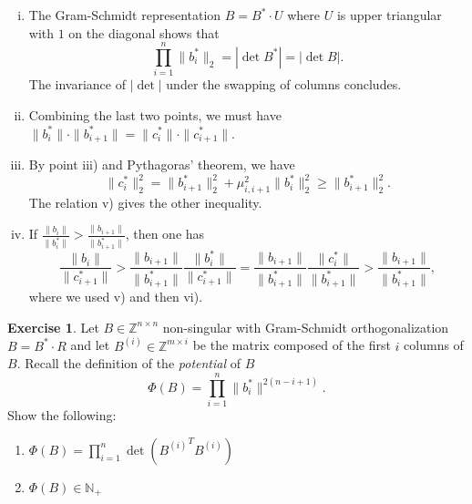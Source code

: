 \documentclass[12pt,a4paper]{article}
\theoremstyle{plain}
\newtheorem*{Sol*}{Solution}
\theoremstyle{definition}
\newtheorem{Ex}{Exercise}
\newif\ifsolutions
\newcommand{\exercise}[2]{
			\begin{Ex} #1 \end{Ex}
			\ifsolutions  \begin{Sol*} #2 \end{Sol*} \bigskip \else \bigskip  \fi
		}
\begin{document}
{\begin{enumerate}[i)]
		As such, the vector $b_{i+1} - v$ is the orthogonal projection of $b_{i+1}$ onto ${\rm span}\{ b_1^*, \dots, b_{i-1}^* \}$, which means that $v = c_{i}^*$.

		\item The Gram-Schmidt representation $B = B^* \cdot U$ where $U$ is upper triangular with $1$ on the diagonal shows that
			\[ \prod_{i=1}^n \| b_i^* \|_2 = |\det B^*| = | \det B|. \]
		The invariance of $|\det|$ under the swapping of columns concludes.

		\item Combining the last two points, we must have $\|b_i^*\| ⋅\|b_{i+1}^*\| = \|c_i^*\| ⋅\|c_{i+1}^*\|$.

		\item By point iii) and Pythagoras' theorem, we have
			\[ \| c_i^* \|^2_2 = \| b_{i+1}^* \|^2_2 + \mu_{i,i+1}^2 \| b_i^* \|^2_2 \geq  \| b_{i+1}^* \|^2_2. \]
		The relation v) gives the other inequality.

		\item If $\frac{\| b_i \|}{\| b_i^* \|} > \frac{\| b_{i+1} \|}{\| b_{i+1}^* \|}$, then one has
			\[ \frac{\| b_{i} \|}{\| c_{i+1}^* \|} > \frac{\| b_{i+1}\|}{\| b_{i+1}^* \|} \frac{\|b_i^* \|}{\| c_{i+1}^* \|} 
										= \frac{\| b_{i+1}\|}{\| b_{i+1}^* \|} \frac{\|c_{i}^* \|}{\| b_{i+1}^* \|} 
										> \frac{\| b_{i+1}\|}{\| b_{i+1}^* \|}, \]
		where we used v) and then vi).

	\end{enumerate}

}

  \exercise{
    Let $B ∈ℤ^{n×n}$ non-singular with Gram-Schmidt orthogonalization $B = B^*⋅ R$ and let $B^{(i)} ∈ℤ^{m ×i}$ be the matrix composed of the first $i$ columns of $B$.  Recall the definition of the \emph{potential} of $B$
    \begin{displaymath}
      Φ(B) = ∏_{i=1}^n \|b_i^*\|^{2(n-i+1)}.
    \end{displaymath}
    Show the following:
    \begin{enumerate}
    \item $ Φ(B) = ∏_{i=1}^n \det\left({B^{(i)}}^T B^{(i)}\right)$
    \item $ Φ(B) ∈ ℕ_+$  
    \end{enumerate}
  }{
	Note that $B^{(i)} = B_*^{(i)} U$ for some upper triangular matrix $U$ with diagonal $1$, and with $ B_*^{(i)}   = (b_1^*, \dots, b_i^*)$.

	Hence $(B_*^{(i)} )^T B_*^{(i)}  = {\rm diag}(\| b_1^* \|_2^2, \dots, \| b_i^* \|_2^2)$, and the determinant $\det\left({B^{(i)}}^T B^{(i)}\right)$ is found to be equal to $\prod_{i=1}^i \| b_i^* \|_2^2$.



}
\end{document}
